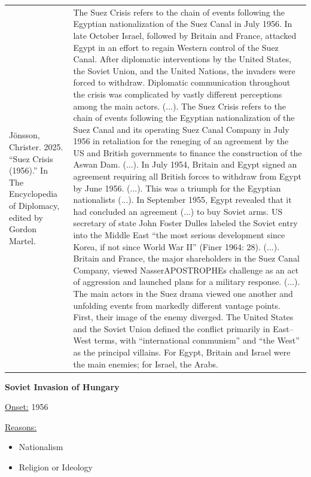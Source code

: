 {\begin{longtable}{p{}p{}}
Jönsson, Christer. 2025. “Suez Crisis (1956).” In The Encyclopedia of Diplomacy, edited by Gordon Martel. & The Suez Crisis refers to the chain of events following the Egyptian nationalization of the Suez Canal in July 1956. In late October Israel, followed by Britain and France, attacked Egypt in an effort to regain Western control of the Suez Canal. After diplomatic interventions by the United States, the Soviet Union, and the United Nations, the invaders were forced to withdraw. Diplomatic communication throughout the crisis was complicated by vastly different perceptions among the main actors. (...). The Suez Crisis refers to the chain of events following the Egyptian nationalization of the Suez Canal and its operating Suez Canal Company in July 1956 in retaliation for the reneging of an agreement by the US and British governments to finance the construction of the Aswan Dam. (...).
In July 1954, Britain and Egypt signed an agreement requiring all British forces to withdraw from Egypt by June 1956. (...). This was a triumph for the Egyptian nationalists (...). In September 1955, Egypt revealed that it had concluded an agreement (...) to buy Soviet arms. US secretary of state John Foster Dulles labeled the Soviet entry into the Middle East “the most serious development since Korea, if not since World War II” (Finer 1964: 28). (...). Britain and France, the major shareholders in the Suez Canal Company, viewed NasserAPOSTROPHEs challenge as an act of aggression and launched plans for a military response. (...).
The main actors in the Suez drama viewed one another and unfolding events from markedly different vantage points. First, their image of the enemy diverged. The United States and the Soviet Union defined the conflict primarily in East–West terms, with “international communism” and “the West” as the principal villains. For Egypt, Britain and Israel were the main enemies; for Israel, the Arabs.
\\
\end{longtable}}
\clearpage
         \textbf{Soviet Invasion of Hungary} 

          \underline{Onset:} 1956         

\underline{Reasons:}
\begin{itemize}
\item Nationalism
\item Religion or Ideology
\end{itemize}

